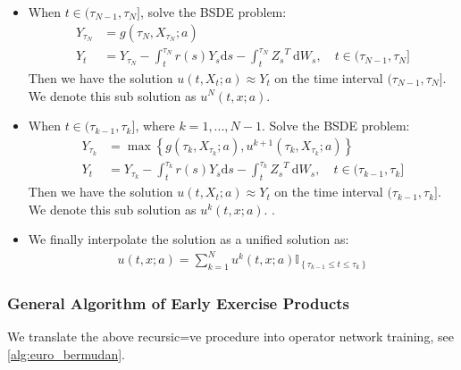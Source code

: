 \documentclass[11pt,a4paper]{article}
\theoremstyle{remark}
\begin{document}
	\begin{itemize}
		\item When $t \in(\tau_{N-1}, \tau_{N}]$, solve the BSDE problem:
		\begin{align*} 
			Y_{\tau_N}&=g\left(\tau_N, X_{\tau_N}; a\right) \\
			Y_t &=Y_{\tau_{N}}-\int_t^{\tau_{N}} r(s)Y_s \mathrm{d} s-\int_t^{\tau_{N}} {Z_s}^{T} \mathrm{~d} W_s, \quad t \in (\tau_{N-1}, \tau_{N}]		
		\end{align*}
		Then we have the solution $u(t, X_t; a) \approx Y_t$ on the time interval $(\tau_{N-1}, \tau_{N}]$. We denote this sub solution as $u^{N}(t,x; a)$. 
		\item When $t \in(\tau_{k-1}, \tau_{k}]$, where $k = 1,..., N-1$. Solve the BSDE problem:
		\begin{align*} 
			Y_{\tau_k}&= \max\left\{ g\left(\tau_k, X_{\tau_k}; a\right) , u^{k+1}(\tau_k, X_{\tau_k}; a)\right\}\\
			Y_t &=Y_{\tau_{k}} - \int_t^{\tau_{k}} r(s)Y_s \mathrm{d} s-\int_t^{\tau_{k}} {Z_s}^{T} \mathrm{~d} W_s, \quad t \in (\tau_{k-1}, \tau_{k}]	
		\end{align*}
		Then we have the solution $u(t, X_t; a) \approx Y_t$ on the time interval $(\tau_{k-1}, \tau_{k}]$. We denote this sub solution as $u^{k}(t,x; a)$. .
		\item We finally interpolate the solution as a unified solution as:
		\begin{align*}
			u(t, x; a) = \sum_{k=1}^N u^{k}(t,x; a) \mathbb{I}_{\left\{\tau_{k-1}\leq t \leq \tau_{k}\right\}}
		\end{align*}
	\end{itemize}
	\subsubsection{General Algorithm of Early Exercise Products} \label{sec:algo2}
	We translate the above recursic=ve procedure into operator network training, see \ref{alg:euro_bermudan}.
	
\end{document}
